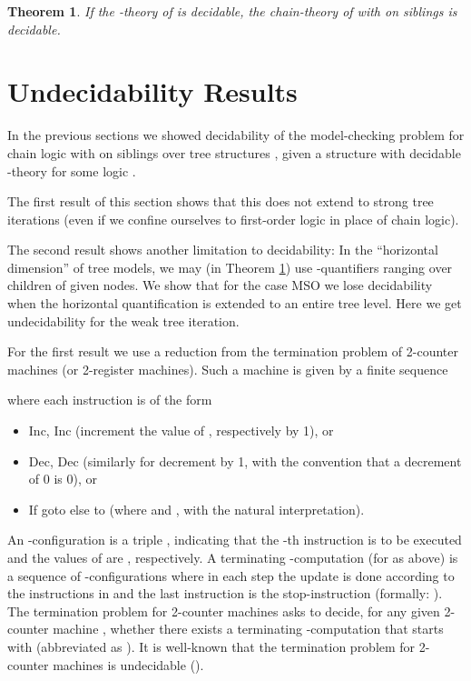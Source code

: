 \documentclass[copyright,creativecommons]{eptcs}
\newtheorem{theorem}{Theorem}
\theoremstyle{plain}
\theoremstyle{nonumberplain}
\begin{document}
\begin{theorem}\label{theo:weaktreeiterations}
If the -theory of  is decidable, the 
chain-theory of  with  on siblings is decidable.
\end{theorem}



\section{Undecidability Results}\label{sec_equlev}



In the previous sections we showed decidability of the model-checking problem
for chain logic with  on siblings over tree structures , given a 
structure  with decidable -theory for some logic . 

The first result of this section shows that this does not 
extend to strong tree iterations  (even if we confine ourselves 
to first-order logic in place of chain logic). 

The second result shows another limitation to decidability:
In the  ``horizontal dimension'' of tree models, we may (in Theorem \ref{theo:weaktreeiterations})
use 
 -quantifiers ranging over children of given nodes. We show 
  that for the case  MSO we lose decidability when the horizontal quantification 
 is extended to an entire tree level. Here we get undecidability for the weak 
 tree iteration.
 
For the first result we use a reduction 
from the termination problem of 2-counter machines (or 2-register machines). 
Such a machine  is given by a finite sequence 

where each instruction  is of the form 
\begin{itemize}
\item 
Inc, Inc 
(increment the value of , respectively  by 1),  or
\item 
Dec, Dec (similarly for decrement by 1, with the 
convention that a decrement of 0 is 0), or 
\item 
If  goto  else to  (where  and , with the natural
interpretation).
\end{itemize}
An -configuration is a triple , indicating 
that the -th instruction is to be executed and the values 
of  are , respectively. A terminating 
-computation (for  as above) 
is a sequence  of -configurations where in each step the update is done
according to the instructions in  and the last 
instruction is the stop-instruction (formally: ). 
The termination problem for 2-counter machines asks to 
decide, for any given 2-counter machine , whether 
there exists a terminating -computation that starts with 
 (abbreviated as ).
It is well-known that the termination problem for
2-counter machines is undecidable (\cite{min67}).
\end{document}
